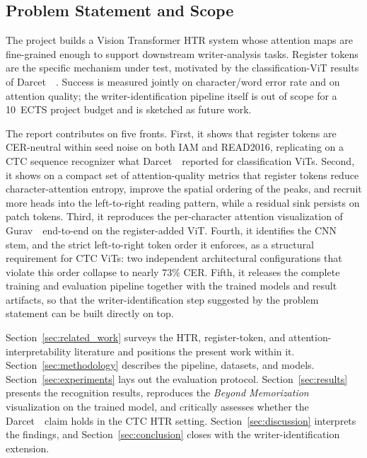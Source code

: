 \subsection{Problem Statement and Scope}
\label{sec:problem}

The project builds a Vision Transformer HTR system whose attention maps are fine-grained enough to support downstream writer-analysis tasks. Register tokens are the specific mechanism under test, motivated by the classification-ViT results of Darcet~\etal~\cite{darcet2024registers}. Success is measured jointly on character/word error rate and on attention quality; the writer-identification pipeline itself is out of scope for a 10~ECTS project budget and is sketched as future work.

The report contributes on five fronts. First, it shows that register tokens are CER-neutral within seed noise on both IAM and READ2016, replicating on a CTC sequence recognizer what Darcet~\etal\ reported for classification ViTs. Second, it shows on a compact set of attention-quality metrics that register tokens reduce character-attention entropy, improve the spatial ordering of the peaks, and recruit more heads into the left-to-right reading pattern, while a residual sink persists on patch tokens. Third, it reproduces the per-character attention visualization of Gurav~\etal\ end-to-end on the register-added ViT. Fourth, it identifies the CNN stem, and the strict left-to-right token order it enforces, as a structural requirement for CTC ViTs: two independent architectural configurations that violate this order collapse to nearly $73\%$ CER. Fifth, it releases the complete training and evaluation pipeline together with the trained models and result artifacts, so that the writer-identification step suggested by the problem statement can be built directly on top.

Section~\ref{sec:related_work} surveys the HTR, register-token, and attention-interpretability literature and positions the present work within it. Section~\ref{sec:methodology} describes the pipeline, datasets, and models. Section~\ref{sec:experiments} lays out the evaluation protocol. Section~\ref{sec:results} presents the recognition results, reproduces the \emph{Beyond Memorization} visualization on the trained model, and critically assesses whether the Darcet~\etal\ claim holds in the CTC HTR setting. Section~\ref{sec:discussion} interprets the findings, and Section~\ref{sec:conclusion} closes with the writer-identification extension.
